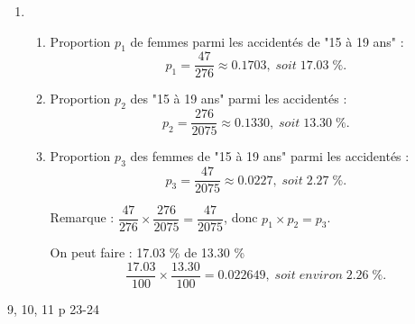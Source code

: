 \documentclass[12pt,a4paper]{article}
\begin{document}
\begin{enumerate}[label=\arabic*. ]
	\medskip 
	
	\item \begin{enumerate}[label=\alph*)]
		\item Proportion $p_1$ de femmes parmi les accidentés de "15 à 19 ans" :
		\begin{equation*}
			p_1=\dfrac{47}{276}\approx \num{0.1703}, \; soit \; \num{17.03}\; \%.
		\end{equation*}
	
		\item Proportion $p_2$ des "15 à 19 ans" parmi les accidentés :
		\begin{equation*}
			p_2=\dfrac{276}{2075} \approx \num{0.1330}, \; soit \; \num{13.30}\; \%.
		\end{equation*}
		
		\item Proportion $p_3$ des femmes de "15 à 19 ans" parmi les accidentés :
		\begin{equation*}
			p_3 = \dfrac{47}{2075} \approx \num{0.0227}, \; soit \; \num{2.27} \; \%.
		\end{equation*}
		
		\begin{myrem}
			Remarque : $\dfrac{47}{276}  \times \dfrac{276}{2075} = \dfrac{47}{2075}$, donc $p_1 \times p_2 = p_3$.
			
			On peut faire : \num{17.03} \% de \num{13.30} \%
			\begin{equation*}
			\dfrac{\num{17.03}}{100} \times \dfrac{\num{13.30}}{100} = \num{0.022649}, \; soit \; environ \; \num{2.26}\; \%.
			\end{equation*}	
		\end{myrem}
		
	\end{enumerate}
\end{enumerate}

\begin{myexos}
	9, 10, 11 p 23-24
\end{myexos}
\end{document}
